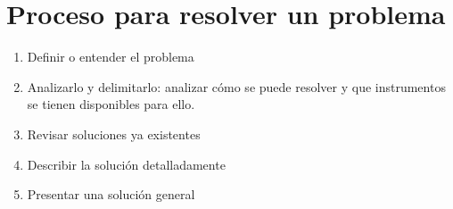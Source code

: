 \documentclass[letter paper, 12pt, oneside]{article}
\begin{document}
\section{Proceso para resolver un problema}

\begin{enumerate}
\item{Definir o entender el problema}


\item{Analizarlo y delimitarlo}: analizar cómo se puede resolver y que instrumentos se tienen disponibles para ello.


\item{Revisar soluciones ya existentes}


\item{Describir la solución detalladamente}


\item{Presentar una solución general}
\end{enumerate}
\end{document}
